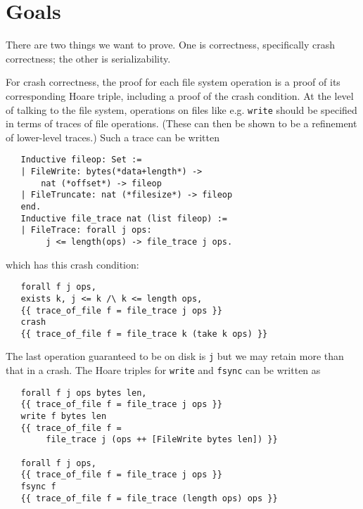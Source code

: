 \documentclass[11pt, twocolumn, letterpaper]{article}
\newcommand{\coqsize}{\scriptsize}
\begin{document}
\section{Goals}

%

There are two things we want to prove.
One is correctness, specifically crash correctness; the other is
serializability.

For crash correctness, the proof for each file system operation is a
proof of its corresponding Hoare triple, including a proof of the
crash condition.
At the level of talking to the file system,
operations on files like e.g. \texttt{write} should be specified in
terms of traces of file operations.
(These can then be shown to be a refinement of lower-level traces.)
Such a trace can be written

{\coqsize
\begin{verbatim}
   Inductive fileop: Set :=
   | FileWrite: bytes(*data+length*) ->
       nat (*offset*) -> fileop
   | FileTruncate: nat (*filesize*) -> fileop
   end.
   Inductive file_trace nat (list fileop) :=
   | FileTrace: forall j ops:
        j <= length(ops) -> file_trace j ops.
\end{verbatim}
}
which has this crash condition:
{\coqsize
\begin{verbatim}
   forall f j ops,
   exists k, j <= k /\ k <= length ops,
   {{ trace_of_file f = file_trace j ops }}
   crash
   {{ trace_of_file f = file_trace k (take k ops) }}
\end{verbatim}
}

The last operation guaranteed to be on disk is \texttt{j}
but we may retain more than that in a crash.
The Hoare triples for \texttt{write} and \texttt{fsync} can be written
as

{\coqsize
\begin{verbatim}
   forall f j ops bytes len,
   {{ trace_of_file f = file_trace j ops }}
   write f bytes len
   {{ trace_of_file f =
        file_trace j (ops ++ [FileWrite bytes len]) }}

   forall f j ops,
   {{ trace_of_file f = file_trace j ops }}
   fsync f
   {{ trace_of_file f = file_trace (length ops) ops }}
\end{verbatim}
}
\end{document}

